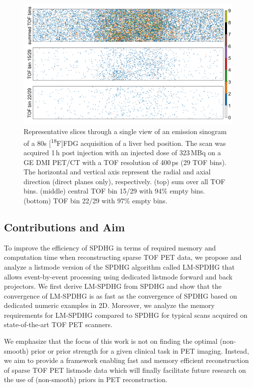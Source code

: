 \begin{figure}
  \centering
    \includegraphics[width=1.0\columnwidth]{./figs/sparsity.png}
  \caption{Representative slices through a single view of an emission sinogram of a 
  80s [\textsuperscript{18}F]FDG acquisition of a liver bed position. 
  The scan was acquired 1\,h post injection with an injected dose of 323\,MBq on
  a GE DMI PET/CT with a TOF resolution of 400\,ps (29 TOF bins). 
  The horizontal and vertical axis represent the radial and axial direction (direct planes only), 
  respectively. 
  (top) sum over all TOF bins. (middle) central TOF bin 15/29 with 94\% empty bins. 
  (bottom) TOF bin 22/29 with 97\% empty bins.}

  \label{fig:sparsity}
\end{figure}


\subsection*{Contributions and Aim}

To improve the efficiency of SPDHG in terms of required memory and computation time when reconstructing 
sparse TOF PET data, we propose and analyze a listmode version of the SPDHG algorithm  called
LM-SPDHG that allows event-by-event processing using dedicated listmode forward and back projectors.
We first derive LM-SPDHG from SPDHG and show that the convergence of LM-SPDHG is as 
fast as the convergence of SPDHG based on dedicated numeric examples in 2D.
Moreover, we analyze the memory requirements for LM-SPDHG compared to SPDHG for typical scans 
acquired on state-of-the-art TOF PET scanners.

We emphasize that the focus of this work is not on finding the
optimal (non-smooth) prior or prior strength for a given clinical task in PET imaging.
Instead, we aim to provide a framework enabling fast and memory efficient reconstruction of 
sparse TOF PET listmode data which will finally facilitate future research on the use of
(non-smooth) priors in PET reconstruction. 


